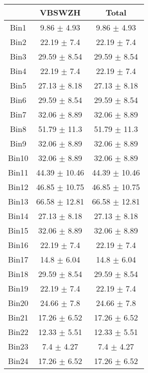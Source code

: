   \begin{tabular}{|c|c|c|}
  \hline
      & VBSWZH & Total \\ \cline{1-3} 
     \hline\hline
     Bin1 & 9.86 $\pm$ 4.93 & 9.86 $\pm$ 4.93 \\ \cline{1-3} 
     Bin2 & 22.19 $\pm$ 7.4 & 22.19 $\pm$ 7.4 \\ \cline{1-3} 
     Bin3 & 29.59 $\pm$ 8.54 & 29.59 $\pm$ 8.54 \\ \cline{1-3} 
     Bin4 & 22.19 $\pm$ 7.4 & 22.19 $\pm$ 7.4 \\ \cline{1-3} 
     Bin5 & 27.13 $\pm$ 8.18 & 27.13 $\pm$ 8.18 \\ \cline{1-3} 
     Bin6 & 29.59 $\pm$ 8.54 & 29.59 $\pm$ 8.54 \\ \cline{1-3} 
     Bin7 & 32.06 $\pm$ 8.89 & 32.06 $\pm$ 8.89 \\ \cline{1-3} 
     Bin8 & 51.79 $\pm$ 11.3 & 51.79 $\pm$ 11.3 \\ \cline{1-3} 
     Bin9 & 32.06 $\pm$ 8.89 & 32.06 $\pm$ 8.89 \\ \cline{1-3} 
     Bin10 & 32.06 $\pm$ 8.89 & 32.06 $\pm$ 8.89 \\ \cline{1-3} 
     Bin11 & 44.39 $\pm$ 10.46 & 44.39 $\pm$ 10.46 \\ \cline{1-3} 
     Bin12 & 46.85 $\pm$ 10.75 & 46.85 $\pm$ 10.75 \\ \cline{1-3} 
     Bin13 & 66.58 $\pm$ 12.81 & 66.58 $\pm$ 12.81 \\ \cline{1-3} 
     Bin14 & 27.13 $\pm$ 8.18 & 27.13 $\pm$ 8.18 \\ \cline{1-3} 
     Bin15 & 32.06 $\pm$ 8.89 & 32.06 $\pm$ 8.89 \\ \cline{1-3} 
     Bin16 & 22.19 $\pm$ 7.4 & 22.19 $\pm$ 7.4 \\ \cline{1-3} 
     Bin17 & 14.8 $\pm$ 6.04 & 14.8 $\pm$ 6.04 \\ \cline{1-3} 
     Bin18 & 29.59 $\pm$ 8.54 & 29.59 $\pm$ 8.54 \\ \cline{1-3} 
     Bin19 & 22.19 $\pm$ 7.4 & 22.19 $\pm$ 7.4 \\ \cline{1-3} 
     Bin20 & 24.66 $\pm$ 7.8 & 24.66 $\pm$ 7.8 \\ \cline{1-3} 
     Bin21 & 17.26 $\pm$ 6.52 & 17.26 $\pm$ 6.52 \\ \cline{1-3} 
     Bin22 & 12.33 $\pm$ 5.51 & 12.33 $\pm$ 5.51 \\ \cline{1-3} 
     Bin23 & 7.4 $\pm$ 4.27 & 7.4 $\pm$ 4.27 \\ \cline{1-3} 
     Bin24 & 17.26 $\pm$ 6.52 & 17.26 $\pm$ 6.52 \\ \cline{1-3} 

\end{tabular}
